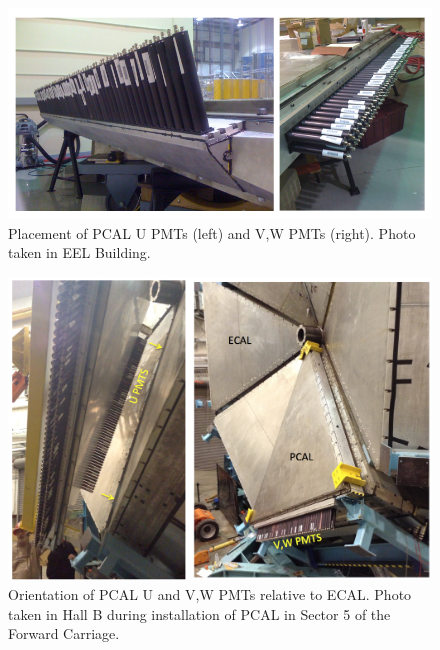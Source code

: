 \documentclass[letterpaper,10pt]{article}
\begin{document}
\begin{figure}[htbp]
  \centering
  \includegraphics[width= 5in, keepaspectratio = true]{pcal-pmts}
  \vspace{2mm}
  \caption{Placement of PCAL U PMTs (left) and V,W PMTs (right).  Photo taken in EEL Building. }
\label{pcal-pmts}
\end{figure}

\begin{figure}[htbp]
  \centering
  \includegraphics[width= 5in, keepaspectratio = true]{pcal-installation}
  \vspace{2mm}
  \caption{Orientation of PCAL U and V,W PMTs relative to ECAL.  Photo taken in Hall B during installation
  of PCAL in Sector 5 of the Forward Carriage.}
\label{pcal-pmts-2}
\end{figure}
\end{document}
